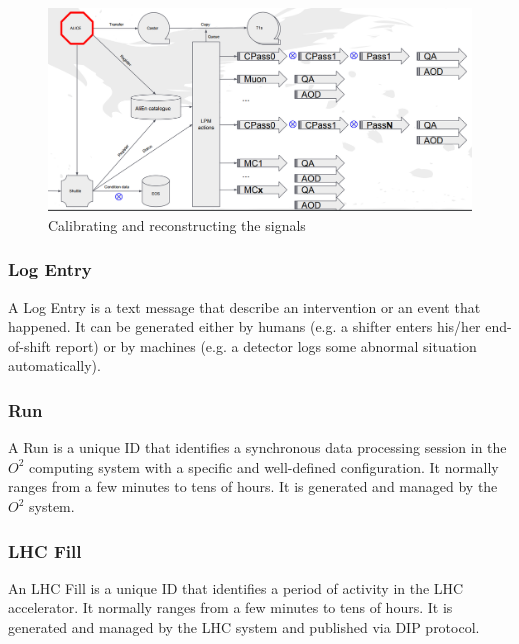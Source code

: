 \begin{figure}[h]
  \begin{center}
    \includegraphics[scale=0.25]{./images/offline_workflow.png}
    \caption{Calibrating and reconstructing the signals}
    \label{fig:offlineWorkflow}
  \end{center}
\end{figure}


\subsubsection{Log Entry}
A Log Entry is a text message that describe an intervention or an event that happened. It can be generated either by humans (e.g. a shifter enters his/her end-of-shift report) or by machines (e.g. a detector logs some abnormal situation automatically). 

\subsubsection{Run}
A Run is a unique ID that identifies a synchronous data processing session in the $O^2$ computing system with a specific and well-defined configuration. It normally ranges from a few minutes to tens of hours. It is generated and managed by the $O^2$ system. 

\subsubsection{LHC Fill}
An LHC Fill is a unique ID that identifies a period of activity in the LHC accelerator. It normally ranges from a few minutes to tens of hours. It is generated and managed by the LHC system and published via DIP protocol. 

